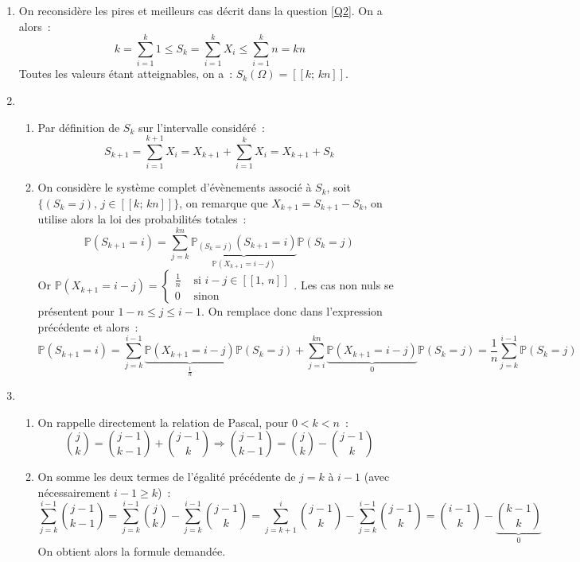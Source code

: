 \documentclass{article}
\newcommand{\prob}{\mathbb{P}}
\begin{document}
  \begin{enumerate}[resume]
    \item On reconsidère les pires et meilleurs cas décrit dans la question \ref{Q2}. On a alors~:
    \[
      k = \sum_{i=1}^k 1 \leqslant S_k = \sum_{i=1}^k X_i \leqslant \sum_{i=1}^k n = kn
    \]
    Toutes les valeurs étant atteignables, on a~: $S_k(\Omega) = [\![k;\, kn]\!]$.

    \item \begin{enumerate}
      \item Par définition de $S_k$ sur l'intervalle considéré~:
      \[
        S_{k+1} = \sum_{i=1}^{k+1} X_i = X_{k+1} + \sum_{i=1}^k X_i = X_{k+1} + S_k
      \]

      \item \label{Q6B} On considère le système complet d'évènements associé à $S_k$, soit $\{(S_k = j),\, j \in [\![k;\, kn]\!]\}$, on remarque que $X_{k+1} = S_{k+1} - S_k$, on utilise alors la loi des probabilités totales~:
      \[
        \prob(S_{k+1} = i) = \sum_{j=k}^{kn} \underbrace{\prob_{(S_k = j)}(S_{k+1} = i)}_{\prob(X_{k+1} = i - j)}\prob(S_k = j)
      \]
      Or $\prob(X_{k+1} = i - j) =
      \left\{
      \begin{aligned}
        \frac{1}{n} & \text{ si } i-j\in [\![1,\, n]\!] \\
        0           & \text{ sinon}
      \end{aligned}
      \right.$. Les cas non nuls se présentent pour $1 - n \leqslant j \leqslant i - 1$. On remplace donc dans l'expression précédente et alors~:
      \[
        \prob(S_{k+1} = i) = \sum_{j=k}^{i - 1} \underbrace{\prob(X_{k+1} = i - j)}_{\frac{1}{n}}\prob(S_k = j) + \sum_{j=i}^{kn} \underbrace{\prob(X_{k+1} = i - j)}_{0}\prob(S_k = j)
        = \frac{1}{n} \sum_{j=k}^{i - 1} \prob(S_k = j)
      \]
    \end{enumerate}

    \item \begin{enumerate}
      \item On rappelle directement la relation de Pascal, pour $0 < k < n$~:
      \[
        {j \choose k} = {j - 1 \choose k - 1} + {j - 1 \choose k} \Longrightarrow {j - 1 \choose k - 1} =   {j \choose k} - {j - 1 \choose k}
      \]

      \item On somme les deux termes de l'égalité précédente de $j = k$ à $i - 1$ (avec nécessairement $i - 1 \geqslant k$)~:
      \[
        \sum_{j=k}^{i - 1} {j - 1 \choose k - 1} = \sum_{j=k}^{i - 1} {j \choose k} - \sum_{j=k}^{i - 1} {j - 1 \choose k} = \sum_{j=k + 1}^{i} {j - 1 \choose k} - \sum_{j=k}^{i - 1} {j - 1 \choose k} = {i - 1 \choose k} -
        \underbrace{k - 1 \choose k}_{0}
      \]
      On obtient alors la formule demandée.


\end{enumerate}
\end{enumerate}
\end{document}
